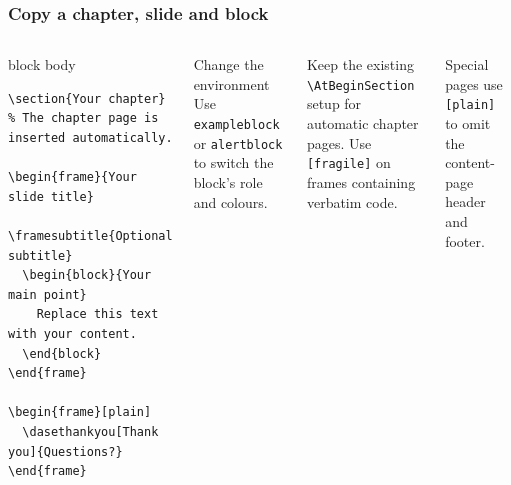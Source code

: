\documentclass[aspectratio=169,10pt]{beamer}
\newenvironment{guideframe}{\begin{frame}[fragile,environment=guideframe]}{\end{frame}}
\begin{document}
\begin{guideframe}
  \frametitle{Copy a chapter, slide and block}
  \begin{columns}[T,onlytextwidth]
      \begin{beamercolorbox}[wd=\linewidth,sep=2mm,rounded=true]{block body}
\scriptsize
\begin{Verbatim}
\section{Your chapter}
% The chapter page is inserted automatically.

\begin{frame}{Your slide title}
  \framesubtitle{Optional subtitle}
  \begin{block}{Your main point}
    Replace this text with your content.
  \end{block}
\end{frame}

\begin{frame}[plain]
  \dasethankyou[Thank you]{Questions?}
\end{frame}
\end{Verbatim}
      \end{beamercolorbox}
      \begin{block}{Change the environment}
        Use \texttt{exampleblock} or \texttt{alertblock} to switch the block's role and colours.
      \end{block}
      \small Keep the existing \texttt{\textbackslash AtBeginSection} setup for automatic chapter pages. Use \texttt{[fragile]} on frames containing verbatim code.
      \par\medskip
      \textcolor{DASEslate}{\scriptsize Special pages use \texttt{[plain]} to omit the content-page header and footer.}
  \end{columns}
\end{guideframe}
\end{document}
